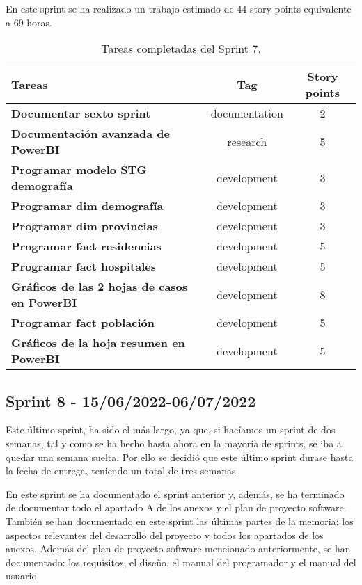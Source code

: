 
En este sprint se ha realizado un trabajo estimado de 44 story points equivalente a 69 horas.

\begin{table}[ht!]
    \centering
    \resizebox{15cm}{!} {
    \begin{tabular}{|l|c|c|}
    \hline
    \textbf{Tareas}     &\textbf{Tag}     & \textbf{Story points} \\ \hline
    \textbf{Documentar sexto sprint}         &documentation      &2 \\ \hline 
    \textbf{Documentación avanzada de PowerBI}         &research      &5 \\ \hline
    \textbf{Programar modelo STG demografía}         &development      &3 \\ \hline 
    \textbf{Programar dim demografía}         &development      &3 \\ \hline 
    \textbf{Programar dim provincias} &development      &3 \\ \hline 
    \textbf{Programar fact residencias}         &development      &5 \\ \hline
    \textbf{Programar fact hospitales}         &development      &5 \\ \hline 
    \textbf{Gráficos de las 2 hojas de casos en PowerBI}         &development      &8 \\ \hline
    \textbf{Programar fact población}         &development      &5 \\ \hline 
    \textbf{Gráficos de la hoja resumen en PowerBI}         &development      &5 \\ \hline
    \end{tabular}}
    \caption{Tareas completadas del Sprint 7.}
    \label{tab:my_label}
\end{table}

\subsection{Sprint 8 - 15/06/2022-06/07/2022}

Este último sprint, ha sido el más largo, ya que, si hacíamos un sprint de dos semanas, tal y como se ha hecho hasta ahora en la mayoría de sprints, se iba a quedar una semana suelta. Por ello se decidió que este último sprint durase hasta la fecha de entrega, teniendo un total de tres semanas.

En este sprint se ha documentado el sprint anterior y, además, se ha terminado de documentar todo el apartado A de los anexos y el plan de proyecto software. También se han documentado en este sprint las últimas partes de la memoria: los aspectos relevantes del desarrollo del proyecto y todos los apartados de los anexos. Además del plan de proyecto software mencionado anteriormente, se han documentado: los requisitos, el diseño, el manual del programador y el manual del usuario.

